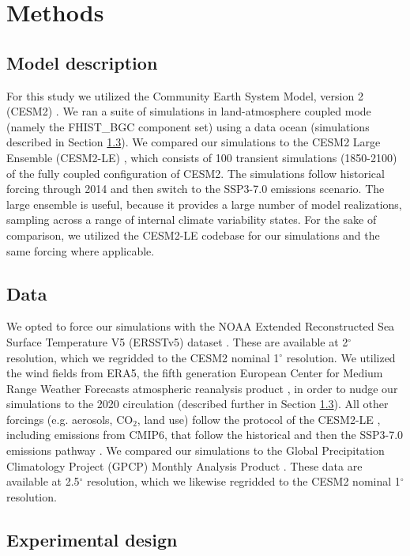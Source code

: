 \documentclass[draft]{agujournal2019}
\begin{document}
\section{Methods}

\subsection{Model description}

For this study we utilized the Community Earth System Model, version 2 (CESM2) \cite{danabasoglu2020}.
We ran a suite of simulations in land-atmosphere coupled mode (namely the FHIST\_BGC component set) using a data ocean (simulations described in Section \ref{sect:exp}).
We compared our simulations to the CESM2 Large Ensemble (CESM2-LE) \cite{rodgers2021}, which consists of 100 transient simulations (1850-2100) of the fully coupled configuration of CESM2.
The simulations follow historical forcing through 2014 and then switch to the SSP3-7.0 emissions scenario.
The large ensemble is useful, because it provides a large number of model realizations, sampling across a range of internal climate variability states.
For the sake of comparison, we utilized the CESM2-LE codebase for our simulations and the same forcing where applicable.

\subsection{Data}

We opted to force our simulations with the NOAA Extended Reconstructed Sea Surface Temperature V5 (ERSSTv5) dataset \cite{huang2017}. These are available at 2$^{\circ}$ resolution, which we regridded to the CESM2 nominal 1$^{\circ}$ resolution.
We utilized the wind fields from ERA5, the fifth generation European Center for Medium Range Weather Forecasts atmospheric reanalysis product \cite{hersbach2020}, in order to nudge our simulations to the 2020 circulation (described further in Section \ref{sect:exp}).
All other forcings (e.g. aerosols, CO$_2$, land use) follow the protocol of the CESM2-LE \cite{rodgers2021}, including emissions from CMIP6, that follow the historical and then the SSP3-7.0 emissions pathway \cite{eyring2016}.
We compared our simulations to the Global Precipitation Climatology Project (GPCP) Monthly Analysis Product \cite{adler2003}.
These data are available at 2.5$^{\circ}$ resolution, which we likewise regridded to the CESM2 nominal 1$^{\circ}$ resolution.

\subsection{Experimental design}
\label{sect:exp}
\end{document}
